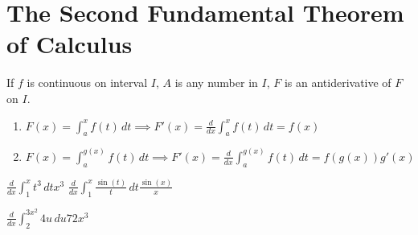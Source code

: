 \section{The Second Fundamental Theorem of Calculus}
 
\begin{myframe}[arc=10pt,auto outer arc]
If $f$ is continuous on interval $I$, $A$ is any number in $I$, $F$ is an antiderivative of $F$ on $I$.
	\begin{enumerate}
\item $\displaystyle F(x) = \int_a^x f(t) \,dt \implies F'(x) = \frac{d}{dx} \int_a^x f(t) \,dt = f(x) $
\item $\displaystyle F(x) = \int_a^{g(x)} f(t) \,dt \implies F'(x) = \frac{d}{dx} \int_a^{g(x)} f(t) \,dt = f(g(x)) g'(x) $
\end{enumerate}
\end{myframe}

\pairofprobsans%
{$\displaystyle \frac{d}{dx} \int_1^x t^3 \,dt $}{$\displaystyle x^3$}%
{$\displaystyle \frac{d}{dx} \int_1^x \frac{\sin{(t)}}{t} \,dt $}{$\displaystyle \frac{\sin{(x)}}{x}$}%

\problemans%
{$\displaystyle \frac{d}{dx} \int_2^{3x^2} 4u \,du $}{$\displaystyle 72x^3$}%


